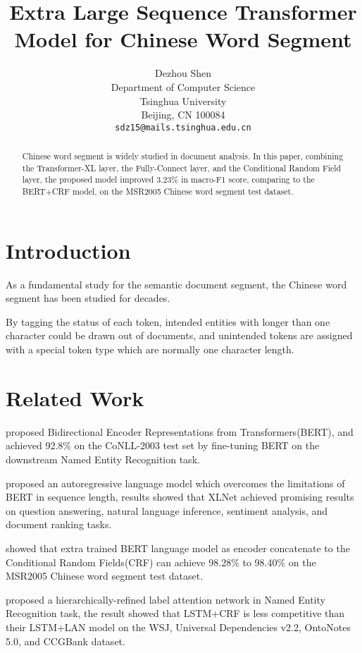 \documentclass[11pt,a4paper]{article}
\title{Extra Large Sequence Transformer Model for Chinese Word Segment}
\author{Dezhou Shen \\
  Department of Computer Science\\
  Tsinghua University\\
  Beijing, CN 100084\\
  \texttt{sdz15@mails.tsinghua.edu.cn} \\}
\date{}
\begin{document}
\maketitle
\begin{abstract}
 Chinese word segment is widely studied in document analysis.
 In this paper, combining the Transformer-XL layer, the Fully-Connect layer, and the Conditional Random Field layer,
 the proposed model improved 3.23\% in macro-F1 score, comparing to the BERT+CRF model, on the MSR2005 Chinese word segment test dataset.
\end{abstract}

\section{Introduction}

 As a fundamental study for the semantic document segment, the Chinese word segment has been studied for decades.

 By tagging the status of each token, intended entities with longer than one character could be drawn out of documents,
 and unintended tokens are assigned with a special token type which are normally one character length.

\section{Related Work}

  \citet{devlin2019bert} proposed Bidirectional Encoder Representations from Transformers(BERT), and achieved 92.8\% on the CoNLL-2003 test set by
fine-tuning BERT on the downstream Named Entity Recognition task.

  \citet{yang2019xlnet} proposed an autoregressive language model which overcomes the limitations of BERT in sequence length,
results showed that XLNet achieved promising results on question answering, natural language inference, sentiment analysis, and document ranking tasks.

  \citet{tian2020improving} showed that extra trained BERT language model as encoder concatenate to the Conditional Random Fields(CRF) can achieve 98.28\% to 98.40\% on the MSR2005 Chinese word segment test dataset.

  \citet{cui2019hierarchically} proposed a hierarchically-refined label attention network in Named Entity Recognition task, the result showed that LSTM+CRF is less competitive than their LSTM+LAN model on the WSJ,
Universal Dependencies v2.2, OntoNotes 5.0, and CCGBank dataset.
\end{document}
